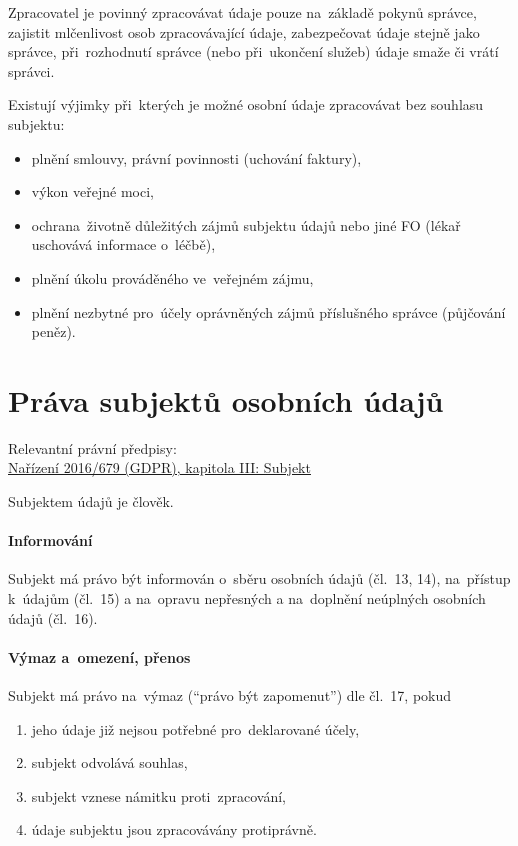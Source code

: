Zpracovatel je povinný zpracovávat údaje pouze na~základě pokynů správce, zajistit mlčenlivost osob zpracovávající údaje, zabezpečovat údaje stejně jako správce, při~rozhodnutí správce (nebo při~ukončení služeb) údaje smaže či vrátí správci.

Existují výjimky při~kterých je možné osobní údaje zpracovávat bez souhlasu subjektu:
\begin{itemize}
    \item plnění smlouvy, právní povinnosti (uchování faktury),
    \item výkon veřejné moci,
    \item ochrana~životně důležitých zájmů subjektu údajů nebo jiné FO (lékař uschovává informace o~léčbě),
    \item plnění úkolu prováděného ve~veřejném zájmu,
    \item plnění nezbytné pro~účely oprávněných zájmů příslušného správce (půjčování peněz).
\end{itemize}


\clearpage
\section{Práva subjektů osobních údajů}

{}Relevantní právní předpisy:
\\\href{https://eur-lex.europa.eu/legal-content/CS/ALL/?uri=CELEX:32016R0679#d1e2150-1-1
}{Nařízení 2016/679 (GDPR), kapitola III: Subjekt}

Subjektem údajů je člověk.


\paragraph{Informování}

Subjekt má právo být informován o~sběru osobních údajů (čl.~13, 14), na~přístup k~údajům (čl.~15) a na~opravu nepřesných a na~doplnění neúplných osobních údajů (čl.~16).


\paragraph{Výmaz a~omezení, přenos}

Subjekt má právo na~výmaz (\enquote{právo být zapomenut}) dle čl.~17, pokud

\begin{enumerate}[label=\alph*)]
\item jeho údaje již nejsou potřebné pro~deklarované účely,
\item subjekt odvolává souhlas,
\item subjekt vznese námitku proti~zpracování,
\item údaje subjektu jsou zpracovávány protiprávně.
\end{enumerate}

